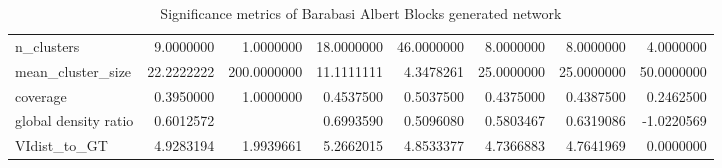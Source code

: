 \begin{table}[ht]
\begin{tabular}{lrrrrrrr}
  n\_clusters & 9.0000000 & 1.0000000 & 18.0000000 & 46.0000000 & 8.0000000 & 8.0000000 & 4.0000000 \\ 
  mean\_cluster\_size & 22.2222222 & 200.0000000 & 11.1111111 & 4.3478261 & 25.0000000 & 25.0000000 & 50.0000000 \\ 
  coverage & 0.3950000 & 1.0000000 & 0.4537500 & 0.5037500 & 0.4375000 & 0.4387500 & 0.2462500 \\ 
  global density ratio & 0.6012572 &  & 0.6993590 & 0.5096080 & 0.5803467 & 0.6319086 & -1.0220569 \\ 
  VIdist\_to\_GT & 4.9283194 & 1.9939661 & 5.2662015 & 4.8533377 & 4.7366883 & 4.7641969 & 0.0000000 \\ 
   \hline
\end{tabular}
\caption{Significance metrics of Barabasi Albert Blocks generated network}
\label{tab:sig_barabasi_albert}
\end{table}
